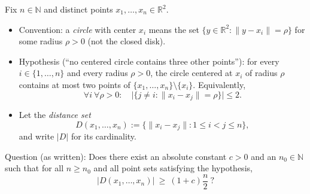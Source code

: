 Fix $n\in\mathbb{N}$ and distinct points $x_1,\dots,x_n\in\mathbb{R}^2$.

\begin{itemize}[leftmargin=*]
\item Convention: a \emph{circle} with center $x_i$ means the set $\{y\in\mathbb{R}^2: \|y-x_i\|=\rho\}$ for some radius $\rho>0$ (not the closed disk).
\item Hypothesis (``no centered circle contains three other points''): for every $i\in\{1,\dots,n\}$ and every radius $\rho>0$, the circle centered at $x_i$ of radius $\rho$ contains at most two points of $\{x_1,\dots,x_n\}\setminus\{x_i\}$. Equivalently,
\[
\forall i\ \forall \rho>0:\quad \bigl|\{j\neq i: \|x_i-x_j\|=\rho\}\bigr|\le 2.
\]
\item Let the \emph{distance set}
\[
D(x_1,\dots,x_n):=\{\|x_i-x_j\|: 1\le i<j\le n\},
\]
and write $|D|$ for its cardinality.
\end{itemize}

Question (as written): Does there exist an absolute constant $c>0$ and an $n_0\in\mathbb{N}$ such that for all $n\ge n_0$ and all point sets satisfying the hypothesis,
\[
|D(x_1,\dots,x_n)|\ \ge\ (1+c)\frac{n}{2}\ ?
\]
